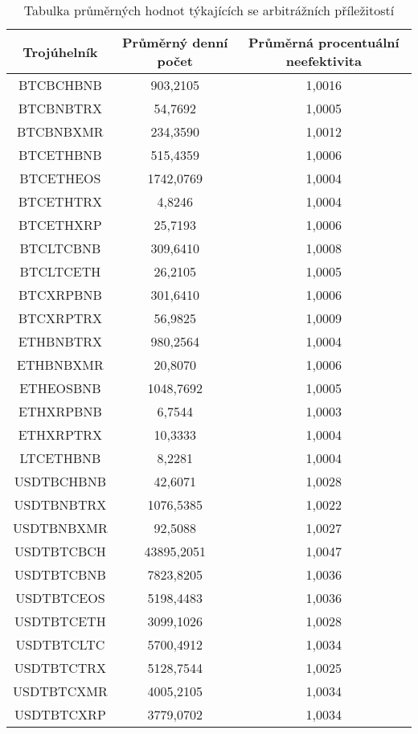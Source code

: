 \begin{table}\centering
\caption{Tabulka průměrných hodnot týkajících se arbitrážních příležitostí}
\label{table_averages}
\begin{tabular}{|| c | c | c ||}\hline Trojúhelník & Průměrný denní počet & Průměrná procentuální neefektivita\\ [0.5ex]
 \hline\hline BTCBCHBNB & 903,2105 & 1,0016\\ 
 \hline BTCBNBTRX & 54,7692 & 1,0005\\ 
 \hline BTCBNBXMR & 234,3590 & 1,0012\\ 
 \hline BTCETHBNB & 515,4359 & 1,0006\\ 
 \hline BTCETHEOS & 1742,0769 & 1,0004\\ 
 \hline BTCETHTRX & 4,8246 & 1,0004\\ 
 \hline BTCETHXRP & 25,7193 & 1,0006\\ 
 \hline BTCLTCBNB & 309,6410 & 1,0008\\ 
 \hline BTCLTCETH & 26,2105 & 1,0005\\ 
 \hline BTCXRPBNB & 301,6410 & 1,0006\\ 
 \hline BTCXRPTRX & 56,9825 & 1,0009\\ 
 \hline ETHBNBTRX & 980,2564 & 1,0004\\ 
 \hline ETHBNBXMR & 20,8070 & 1,0006\\ 
 \hline ETHEOSBNB & 1048,7692 & 1,0005\\ 
 \hline ETHXRPBNB & 6,7544 & 1,0003\\ 
 \hline ETHXRPTRX & 10,3333 & 1,0004\\ 
 \hline LTCETHBNB & 8,2281 & 1,0004\\ 
 \hline USDTBCHBNB & 42,6071 & 1,0028\\ 
 \hline USDTBNBTRX & 1076,5385 & 1,0022\\ 
 \hline USDTBNBXMR & 92,5088 & 1,0027\\ 
 \hline USDTBTCBCH & 43895,2051 & 1,0047\\ 
 \hline USDTBTCBNB & 7823,8205 & 1,0036\\ 
 \hline USDTBTCEOS & 5198,4483 & 1,0036\\ 
 \hline USDTBTCETH & 3099,1026 & 1,0028\\ 
 \hline USDTBTCLTC & 5700,4912 & 1,0034\\ 
 \hline USDTBTCTRX & 5128,7544 & 1,0025\\ 
 \hline USDTBTCXMR & 4005,2105 & 1,0034\\ 
 \hline USDTBTCXRP & 3779,0702 & 1,0034\\ 

\end{tabular}
\end{table}
